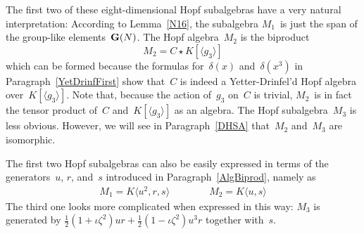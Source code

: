 \documentclass{article}
\numberwithin{equation}{section}
\theoremstyle{definition}
\theoremstyle{break}
\newcommand{\K}{1}
\newcommand{\1}{{(1)}}
\newcommand{\2}{{(2)}}
\newcommand{\3}{{(3)}}
\begin{document}
The first two of these eight-dimensional Hopf subalgebras have a very natural interpretation: According to Lemma~\ref{N16}, the subalgebra $M_1$~is just the span of the group-like
elements~${\bf G}(N)$. The Hopf algebra~$M_2$ is the biproduct
\[M_2 = C \star K[\langle g_3 \rangle] \]
which can be formed because the formulas for~$\delta(x)$ and~$\delta(x^3)$ in Paragraph~\ref{YetDrinfFirst} show that~$C$ is indeed a Yetter-Drinfel'd Hopf algebra
over~$K[\langle g_3 \rangle]$. Note that, because the action of~$g_3$ on~$C$ is trivial, $M_2$~is in fact the tensor product of~$C$ and~$K[\langle g_3 \rangle]$ as an algebra. The Hopf subalgebra~$M_3$ is less obvious. However, we will see in Paragraph~\ref{DHSA} that~$M_2$ and~$M_3$ are isomorphic.

The first two Hopf subalgebras can also be easily expressed in terms of the generators~$u$, $r$, and~$s$ introduced in Paragraph~\ref{AlgBiprod}, namely as
\begin{align*}
M_1 = K\langle u^2, r, s \rangle \qquad \qquad M_2 = K\langle u, s \rangle
\end{align*}
The third one looks more complicated when expressed in this way: $M_3$ is generated by $\frac{\K}{2}(1 + \iota \zeta^2) u r + \frac{\K}{2}(1 - \iota \zeta^2) u^3 r$ together with~$s$.
\end{document}
